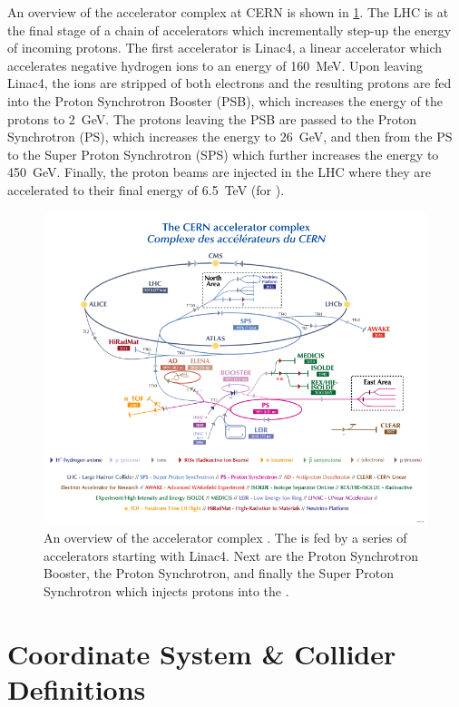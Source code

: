 An overview of the accelerator complex at CERN is shown in \cref{fig:accelerator_complex}.
The LHC is at the final stage of a chain of accelerators which incrementally step-up the energy of incoming protons.
The first accelerator is Linac4, a linear accelerator which accelerates negative hydrogen ions to an energy of \SI{160}{\MeV}.
Upon leaving Linac4, the ions are stripped of both electrons and the resulting protons are fed into the Proton Synchrotron Booster (PSB), which increases the energy of the protons to \SI{2}{\GeV}.
The protons leaving the PSB are passed to the Proton Synchrotron (PS), which increases the energy to \SI{26}{\GeV}, and then from the PS to the Super Proton Synchrotron (SPS) which further increases the energy to \SI{450}{\GeV}.
Finally, the proton beams are injected in the LHC where they are accelerated to their final energy of \SI{6.5}{\TeV} (for \runtwo).

\begin{figure}[!htbp]
  \centering
  \includegraphics[width=\textwidth]{chapters/2.detector/figs/accelerator_complex.pdf}
  \caption{
    An overview of the \CERN accelerator complex \cite{CERN:2012:accelerators}.
    The \LHC is fed by a series of accelerators starting with Linac4.
    Next are the Proton Synchrotron Booster, the Proton Synchrotron, and finally the Super Proton Synchrotron which injects protons into the \LHC.
  }
  \label{fig:accelerator_complex}
\end{figure}


\section{Coordinate System \& Collider Definitions}\label{sec:atlas_coords}

